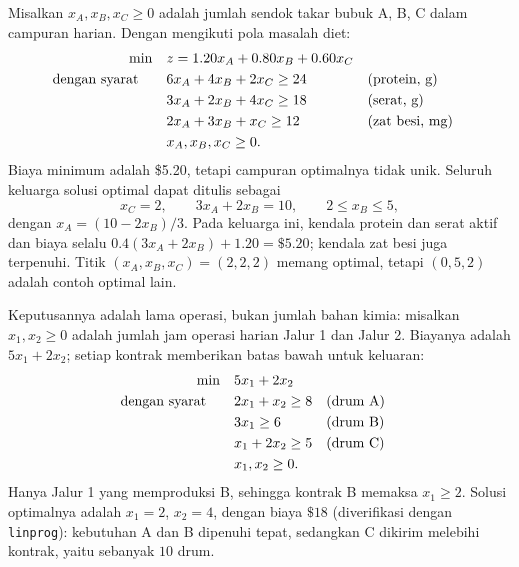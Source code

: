 Misalkan $x_A, x_B, x_C \geq 0$ adalah jumlah sendok takar bubuk A, B, C dalam campuran harian. Dengan mengikuti pola masalah diet:
\begin{align*}
\min \quad & z = 1.20x_A + 0.80x_B + 0.60x_C\\
\mbox{dengan syarat}\quad \quad & 6x_A + 4x_B + 2x_C \geq 24 && \mbox{(protein, g)}\\
& 3x_A + 2x_B + 4x_C \geq 18 && \mbox{(serat, g)}\\
& 2x_A + 3x_B + x_C \geq 12 && \mbox{(zat besi, mg)}\\
& x_A, x_B, x_C \geq 0.
\end{align*}
Biaya minimum adalah \$5.20, tetapi campuran optimalnya tidak unik. Seluruh keluarga solusi optimal dapat ditulis sebagai
\[
x_C=2,\qquad 3x_A+2x_B=10,\qquad 2\leq x_B\leq 5,
\]
dengan $x_A=(10-2x_B)/3$. Pada keluarga ini, kendala protein dan serat aktif dan biaya selalu $0.4(3x_A+2x_B)+1.20=\$5.20$; kendala zat besi juga terpenuhi. Titik $(x_A,x_B,x_C)=(2,2,2)$ memang optimal, tetapi $(0,5,2)$ adalah contoh optimal lain.


Keputusannya adalah lama operasi, bukan jumlah bahan kimia: misalkan $x_1, x_2 \ge 0$ adalah jumlah jam operasi harian Jalur 1 dan Jalur 2. Biayanya adalah $5x_1 + 2x_2$; setiap kontrak memberikan batas bawah untuk keluaran:
\begin{align*}
\min \quad & 5x_1 + 2x_2\\
\mbox{dengan syarat}\quad \quad & 2x_1 + x_2 \geq 8 && \mbox{(drum A)}\\
& 3x_1 \geq 6 && \mbox{(drum B)}\\
& x_1 + 2x_2 \geq 5 && \mbox{(drum C)}\\
& x_1, x_2 \geq 0.
\end{align*}
Hanya Jalur 1 yang memproduksi B, sehingga kontrak B memaksa $x_1 \ge 2$. Solusi optimalnya adalah $x_1 = 2$, $x_2 = 4$, dengan biaya $\$18$ (diverifikasi dengan \texttt{linprog}): kebutuhan A dan B dipenuhi tepat, sedangkan C dikirim melebihi kontrak, yaitu sebanyak $10$ drum.


